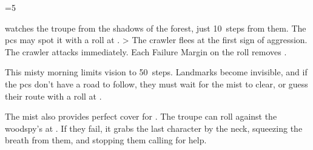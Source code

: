 \ifnum\value{cycle}=5


\chitincrawler
{} watches the troupe from the shadows of the forest, just 10~\glspl{step} from them.
The \glspl{pc} may spot it with a  roll at
\tn.
\ifnum\value{r12}>\value{hp}
  The \gls{crawler} flees at the first sign of aggression.
\else
  The \gls{crawler} attacks immediately.
  Each Failure Margin on the roll removes .
\fi

\else

\woodspy


This misty morning limits vision to 50~\glspl{step}.
Landmarks become invisible, and if the \glspl{pc} don't have a road to follow, they must wait  for the mist to clear, or guess their route with a  roll at \tn[10].

The mist also provides perfect cover for .
The troupe can roll  against the \gls{woodspy}'s  at \tn.
If they fail, it grabs the last character by the neck, squeezing the breath from them, and stopping them calling for help.

\fi

